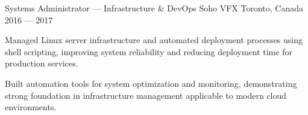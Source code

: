 \begin{cventries}
\cventry%
	{Systems Administrator --- Infrastructure \& DevOps}
	{Soho VFX}
	{Toronto, Canada}
	{2016 --- 2017}
	{
		\begin{cvitems}
			\item Managed Linux server infrastructure and automated deployment processes using shell scripting, improving system reliability and reducing deployment time for production services.
			\item Built automation tools for system optimization and monitoring, demonstrating strong foundation in infrastructure management applicable to modern cloud environments.
		\end{cvitems}
	}

\end{cventries}